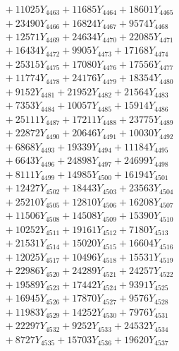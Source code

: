 \documentclass[a4paper,10pt]{article}
\begin{document}
{\begin{align}
&\;  + 11025 Y_{4463} + 11685 Y_{4464} + 18601 Y_{4465} \\[0.3ex]
&\;  + 23490 Y_{4466} + 16824 Y_{4467} + 9574 Y_{4468} \\[0.5ex]\allowbreak
&\;  + 12571 Y_{4469} + 24634 Y_{4470} + 22085 Y_{4471} \\[0.3ex]
&\;  + 16434 Y_{4472} + 9905 Y_{4473} + 17168 Y_{4474} \\[0.3ex]
&\;  + 25315 Y_{4475} + 17080 Y_{4476} + 17556 Y_{4477} \\[0.3ex]
&\;  + 11774 Y_{4478} + 24176 Y_{4479} + 18354 Y_{4480} \\[0.3ex]
&\;  + 9152 Y_{4481} + 21952 Y_{4482} + 21564 Y_{4483} \\[0.3ex]
&\;  + 7353 Y_{4484} + 10057 Y_{4485} + 15914 Y_{4486} \\[0.3ex]
&\;  + 25111 Y_{4487} + 17211 Y_{4488} + 23775 Y_{4489} \\[0.3ex]
&\;  + 22872 Y_{4490} + 20646 Y_{4491} + 10030 Y_{4492} \\[0.3ex]
&\;  + 6868 Y_{4493} + 19339 Y_{4494} + 11184 Y_{4495} \\[0.3ex]
&\;  + 6643 Y_{4496} + 24898 Y_{4497} + 24699 Y_{4498} \\[0.5ex]\allowbreak
&\;  + 8111 Y_{4499} + 14985 Y_{4500} + 16194 Y_{4501} \\[0.3ex]
&\;  + 12427 Y_{4502} + 18443 Y_{4503} + 23563 Y_{4504} \\[0.3ex]
&\;  + 25210 Y_{4505} + 12810 Y_{4506} + 16208 Y_{4507} \\[0.3ex]
&\;  + 11506 Y_{4508} + 14508 Y_{4509} + 15390 Y_{4510} \\[0.3ex]
&\;  + 10252 Y_{4511} + 19161 Y_{4512} + 7180 Y_{4513} \\[0.3ex]
&\;  + 21531 Y_{4514} + 15020 Y_{4515} + 16604 Y_{4516} \\[0.3ex]
&\;  + 12025 Y_{4517} + 10496 Y_{4518} + 15531 Y_{4519} \\[0.3ex]
&\;  + 22986 Y_{4520} + 24289 Y_{4521} + 24257 Y_{4522} \\[0.3ex]
&\;  + 19589 Y_{4523} + 17442 Y_{4524} + 9391 Y_{4525} \\[0.3ex]
&\;  + 16945 Y_{4526} + 17870 Y_{4527} + 9576 Y_{4528} \\[0.5ex]\allowbreak
&\;  + 11983 Y_{4529} + 14252 Y_{4530} + 7976 Y_{4531} \\[0.3ex]
&\;  + 22297 Y_{4532} + 9252 Y_{4533} + 24532 Y_{4534} \\[0.3ex]
&\;  + 8727 Y_{4535} + 15703 Y_{4536} + 19620 Y_{4537} \\[0.3ex]

\end{align}}
\end{document}
